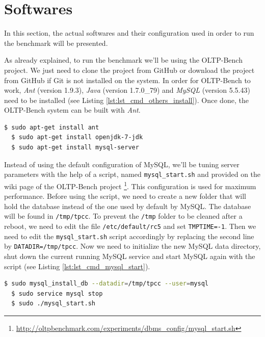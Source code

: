 \section{Softwares}
\label{sec:softwares}
In this section, the actual softwares and their configuration used in order to run the benchmark will be presented.

As already explained, to run the benchmark we'll be using the OLTP-Bench project. 
We just need to clone the project from GitHub 
or download the project from GitHub if Git is not installed on the system. 
In order for OLTP-Bench to work, \textit{Ant} (version 1.9.3), \textit{Java} (version 1.7.0\_79) and \textit{MySQL} (version 5.5.43) need to be installed (see Listing \ref{lst:lst_cmd_others_install}). 
Once done, the OLTP-Bench system can be built with \textit{Ant}.


{
\singlespacing
\begin{lstlisting}[frame=single,language=bash,caption={Ant, Java and MySQL installation},label={lst:lst_cmd_others_install}]
  $ sudo apt-get install ant
  $ sudo apt-get install openjdk-7-jdk
  $ sudo apt-get install mysql-server
\end{lstlisting}
}

Instead of using the default configuration of MySQL, we'll be tuning server parameters with the help of a script, named \texttt{mysql\_start.sh} and provided on the wiki page of the OLTP-Bench project
\footnote{\url{http://oltpbenchmark.com/experiments/dbms_config/mysql_start.sh}}. 
This configuration is used for maximum performance. 
Before using the script, we need to create a new folder that will hold the database instead of the one used by default by MySQL. 
The database will be found in \texttt{/tmp/tpcc}. 
To prevent the \texttt{/tmp} folder to be cleaned after a reboot, we need to edit the file \texttt{/etc/default/rc5} and set \texttt{TMPTIME=-1}. 
Then we need to edit the \texttt{mysql\_start.sh} script accordingly by replacing the second line by \texttt{DATADIR=/tmp/tpcc}. 
Now we need to initialize the new MySQL data directory, shut down the current running MySQL service and start MySQL again with the script (see Listing \ref{lst:lst_cmd_mysql_start}).

{
\singlespacing
\begin{lstlisting}[frame=single,language=bash,caption={Ant, Java and MySQL installation},label={lst:lst_cmd_mysql_start}]
  $ sudo mysql_install_db --datadir=/tmp/tpcc --user=mysql
  $ sudo service mysql stop
  $ sudo ./mysql_start.sh
\end{lstlisting}
}

